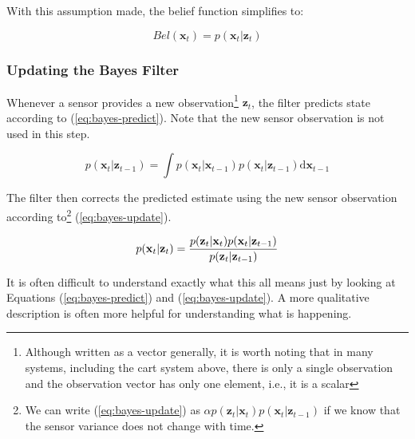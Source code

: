 With this assumption made, the belief function simplifies to:

\begin{equation}\label{eq:markov-belief}
Bel(\mathbf{x}_{t}) = p(\mathbf{x}_{t} | \mathbf{z}_{t})
\end{equation}

\subsubsection{Updating the Bayes Filter}\label{sec:updating-bayes}
Whenever a sensor provides a new observation\footnote{
    Although written as a vector generally, it is worth noting that in many systems,
    including the cart system above, there is only a single observation and the
    observation vector has only one element, i.e., it is a scalar}
$\mathbf{z}_{t}$, the filter predicts state according
to (\ref{eq:bayes-predict}). Note that the new sensor observation is not used in this step.

\begin{equation}\label{eq:bayes-predict}
p(\mathbf{x}_{t} | \mathbf{z}_{t-1}) = \int{p(\mathbf{x}_{t} | \mathbf{x}_{t-1})
p(\mathbf{x}_{t} | \mathbf{z}_{t-1})\mathrm{d}\mathbf{x}_{t-1}}
\end{equation}

The filter then corrects the predicted estimate using the new sensor observation
according to\footnote{
We can write (\ref{eq:bayes-update}) as
$\alpha p(\mathbf{z}_{t} | \mathbf{x}_{t})p(\mathbf{x}_{t} | \mathbf{z}_{t-1})$
if we know that the sensor variance does not change with time.
}
    (\ref{eq:bayes-update}).

\begin{equation}\label{eq:bayes-update}
    p(\mathbf{x}_{t} | \mathbf{z}_{t}) =
    \frac
    {p(\mathbf{z}_{t} | \mathbf{x}_{t})p(\mathbf{x}_{t} | \mathbf{z}_{t-1})}
    {p(\mathbf{z}_{t} | \mathbf{z}_{t-1})}\\
\end{equation}


It is often difficult to understand exactly what this all means just by looking at
Equations (\ref{eq:bayes-predict}) and (\ref{eq:bayes-update}).
A more qualitative description is often more helpful for understanding what is
happening.

